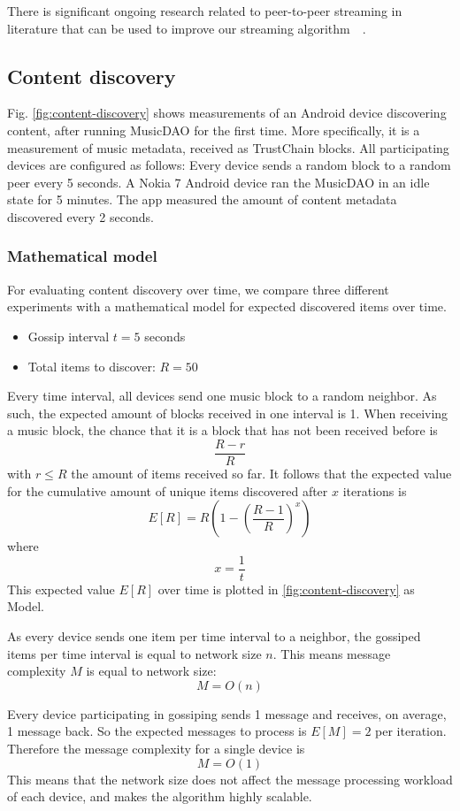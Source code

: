 There is significant ongoing research related to peer-to-peer streaming in literature that can be used to improve our streaming algorithm~\citep{erman2008piece}~\citep{akkanen2017continuous}.

\subsection{Content discovery}
Fig. \ref{fig:content-discovery} shows measurements of an Android device discovering content, after running MusicDAO for the first time. More specifically, it is a measurement of music metadata, received as TrustChain blocks. All participating devices are configured as follows: Every device sends a random block to a random peer every 5 seconds. A Nokia 7 Android device ran the MusicDAO in an idle state for 5 minutes. The app measured the amount of content metadata discovered every 2 seconds. 

\subsubsection{\textbf{Mathematical model}}
For evaluating content discovery over time, we compare three different experiments with a mathematical model for expected discovered items over time.

\begin{itemize}
    \item Gossip interval $t=5$ seconds
    \item Total items to discover: $R=50$
\end{itemize}

Every time interval, all devices send one music block to a random neighbor. As such, the expected amount of blocks received in one interval is 1. When receiving a music block, the chance that it is a block that has not been received before is $$\frac{R-r}{R}$$ with $r\leq R$ the amount of items received so far. It follows that the expected value for the cumulative amount of unique items discovered after $x$ iterations is $$E[R]=R(1-(\frac{R-1}{R})^{x})$$ where $$x=\frac{1}{t}$$ This expected value $E[R]$ over time is plotted in \ref{fig:content-discovery} as Model.

As every device sends one item per time interval to a neighbor, the gossiped items per time interval is equal to network size $n$. This means message complexity $M$ is equal to network size: $$M=O(n)$$

Every device participating in gossiping sends 1 message and receives, on average, 1 message back. So the expected messages to process is $E[M]=2$ per iteration. Therefore the message complexity for a single device is $$M=O(1)$$ This means that the network size does not affect the message processing workload of each device, and makes the algorithm highly scalable.

